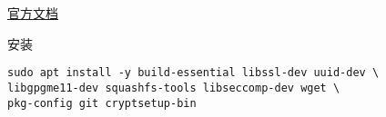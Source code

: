 
\begin{issues}
\issueDraft
\end{issues}

\href{https://docs.sylabs.io/guides/3.0/user-guide/index.html}{官方文档}

安装
\begin{lstlisting}[language=none]
sudo apt install -y build-essential libssl-dev uuid-dev \
libgpgme11-dev squashfs-tools libseccomp-dev wget \
pkg-config git cryptsetup-bin
\end{lstlisting}
